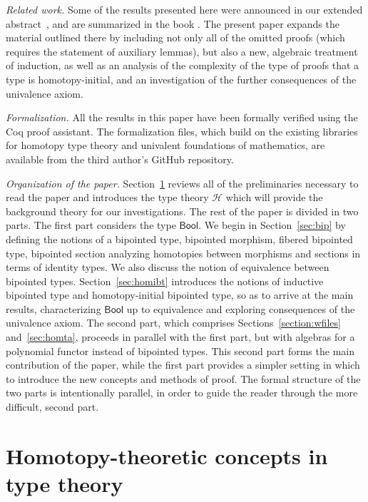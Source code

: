 \documentclass[10pt,a4paper,oneside,reqno]{amsart}
\numberwithin{equation}{section}
\theoremstyle{mythm}
\theoremstyle{mydef}
\theoremstyle{myrmk}
\newcommand{\Hint}{\mathcal{H}}
\newcommand{\Bool}{\mathsf{Bool}}
\begin{document}
\medskip

\noindent
\emph{Related work.} Some of the results presented here were announced in our extended abstract~\cite{wtypes}, and are summarized in the book \cite{hott}. The present paper expands the material outlined there by including not only all of the omitted proofs (which requires the statement of auxiliary lemmas), but also a new, algebraic treatment of induction, as well as an analysis of the complexity of the type of proofs that a type is homotopy-initial, and an investigation of the further consequences of the univalence axiom.

\smallskip

\noindent
\emph{Formalization.} All the results in this paper have been formally verified using the
Coq proof assistant. The formalization files, which build on the existing libraries for homotopy type theory and 
univalent foundations of mathematics, are available from the third author's GitHub repository.

\smallskip

\noindent
\emph{Organization of the paper.} Section~\ref{sec:bac} reviews all of the  preliminaries necessary to
read the paper and introduces the type theory $\Hint$ which will provide the background theory for
our investigations. The rest of the paper is divided in two parts. The first part considers the type $\Bool$.
We begin in Section~\ref{sec:bip} by defining the notions of a bipointed type, bipointed morphism,
fibered bipointed type, bipointed section analyzing homotopies between morphisms and 
sections in terms of identity types. We also discuss the notion of equivalence between bipointed types.
Section~\ref{sec:homibt} introduces the notions of inductive bipointed type and homotopy-initial
bipointed type, so as to arrive at the main results, characterizing $\Bool$ up to equivalence and
exploring consequences of the univalence axiom. The second part, which comprises
Sections~\ref{section:wfiles} and~\ref{sec:homta}, proceeds in parallel with the 
first part, but with algebras for a polynomial functor instead of bipointed types. 
This second part forms the main contribution of the paper, while the first part provides a simpler setting in which to introduce the new concepts and methods of proof.  The formal structure of the two parts is intentionally parallel, in order to guide the reader through the more difficult, second part.


\section{Homotopy-theoretic concepts in type theory}
\label{sec:bac}
\end{document}
